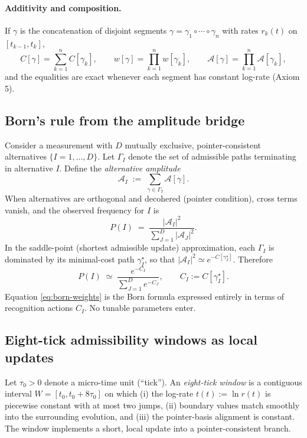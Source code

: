 \documentclass[11pt,letterpaper]{article}
\begin{document}
\paragraph{Additivity and composition.}
If \(\gamma\) is the concatenation of disjoint segments \(\gamma=\gamma_1\circ\cdots\circ\gamma_n\) with rates \(r_k(t)\) on \([t_{k-1},t_k]\),
\begin{equation}
C[\gamma]=\sum_{k=1}^n C[\gamma_k],\qquad
w[\gamma]=\prod_{k=1}^n w[\gamma_k],\qquad
\mathcal A[\gamma]=\prod_{k=1}^n \mathcal A[\gamma_k],
\end{equation}
and the equalities are exact whenever each segment has constant log-rate (Axiom 5).

\subsection{Born's rule from the amplitude bridge}
Consider a measurement with \(D\) mutually exclusive, pointer-consistent alternatives \(\{I=1,\dots,D\}\). Let \(\Gamma_I\) denote the set of admissible paths terminating in alternative \(I\). Define the \emph{alternative amplitude}
\begin{equation}
\mathcal A_I\;:=\;\sum_{\gamma\in\Gamma_I} \mathcal A[\gamma].
\label{eq:AI-def}
\end{equation}
When alternatives are orthogonal and decohered (pointer condition), cross terms vanish, and the observed frequency for \(I\) is
\begin{equation}
P(I)\;=\;\frac{|\mathcal A_I|^2}{\sum_{J=1}^D |\mathcal A_J|^2}.
\label{eq:born-master}
\end{equation}
In the saddle-point (shortest admissible update) approximation, each \(\Gamma_I\) is dominated by its minimal-cost path \(\gamma_I^\star\), so that \(|\mathcal A_I|^2 \simeq e^{-C[\gamma_I^\star]}\). Therefore
\begin{equation}
P(I)\;\simeq\;\frac{e^{-C_I}}{\sum_{J=1}^D e^{-C_J}},
\qquad C_I:=C[\gamma_I^\star].
\label{eq:born-weights}
\end{equation}
Equation \eqref{eq:born-weights} is the Born formula expressed entirely in terms of recognition actions \(C_I\). No tunable parameters enter.

\subsection{Eight-tick admissibility windows as local updates}
Let \(\tau_0>0\) denote a micro-time unit (``tick''). An \emph{eight-tick window} is a contiguous interval \(W=[t_0,t_0+8\tau_0]\) on which (i) the log-rate \(t(t):=\ln r(t)\) is piecewise constant with at most two jumps, (ii) boundary values match smoothly into the surrounding evolution, and (iii) the pointer-basis alignment is constant. The window implements a short, local update into a pointer-consistent branch.
\end{document}
